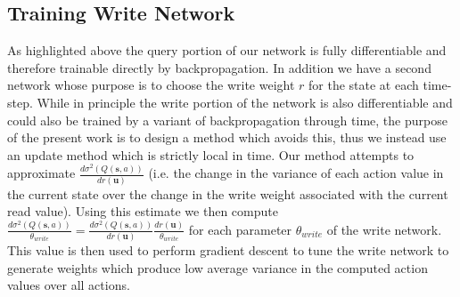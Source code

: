 \documentclass{article}
\begin{document}
\subsection*{Training Write Network}
As highlighted above the query portion of our network is fully differentiable and therefore trainable directly by backpropagation. In addition we have a second network whose purpose is to choose the write weight $r$ for the state at each time-step. While in principle the write portion of the network is also differentiable and could also be trained by a variant of backpropagation through time, the purpose of the present work is to design a method which avoids this, thus we instead use an update method which is strictly local in time. Our method attempts to approximate $\frac{d\sigma^2(Q(\pmb{s},a))}{dr(\pmb{u})}$ (i.e. the change in the variance of each action value in the current state over the change in the write weight associated with the current read value). Using this estimate we then compute $\frac{d\sigma^2(Q(\pmb{s},a))}{\theta_{write}}=\frac{d\sigma^2(Q(\pmb{s},a))}{dr(\pmb{u})}\frac{dr(\pmb{u})}{\theta_{write}}$ for each parameter $\theta_{write}$ of the write network. This value is then used to perform gradient descent to tune the write network to generate weights which produce low average variance in the computed action values over all actions.
\end{document}
